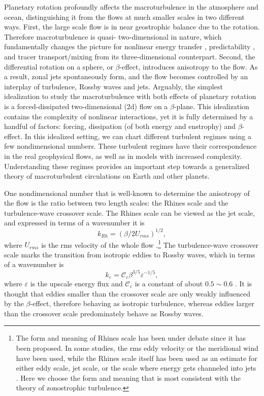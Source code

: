 \documentclass{jfm}
\begin{document}
Planetary rotation profoundly affects the macroturbulence in the
atmosphere and ocean, distinguishing it from the flows at much smaller
scales in two different ways. First, the large scale flow is in near
geostrophic balance due to the rotation. Therefore macroturbulence
is quasi- two-dimensional in nature, which fundamentally changes the
picture for nonlinear energy transfer \citep{Kraichnan1967,Charney1971},
predictability \citep{Leith1971,Leith1972}, and tracer transport/mixing
\citep{Batchelor1959,Shuckburgh2003} from its three-dimensional counterpart.
Second, the differential rotation on a sphere, or $\beta$-effect,
introduces anisotropy to the flow. As a result, zonal jets spontaneously
form, and the flow becomes controlled by an interplay of turbulence, Rossby waves
and jets. Arguably, the simplest idealization to study the macroturbulence
with both effects of planetary rotation is a forced-dissipated two-dimensional
(2d) flow on a $\beta$-plane. This idealization contains the complexity
of nonlinear interactions, yet it is fully determined by a handful
of factors: forcing, dissipation (of both energy and enstrophy) and
$\beta$-effect. In this idealized setting, we can chart
different turbulent regimes using a few nondimensional numbers.
These turbulent regimes have their correspondence in the real geophysical
flows, as well as in models with increased complexity. Understanding
these regimes provides an important step towards a generalized theory 
of macroturbulent circulations on Earth and other planets.

One nondimensional number that is well-known to determine the anisotropy
of the flow is the ratio between two length scales: the Rhines scale
and the turbulence-wave crossover scale. The Rhines scale
can be viewed as the jet scale, and expressed in terms of a wavenumber it is
\begin{equation}
    k_{Rh}=(\beta/2U_{rms})^{1/2},\label{eq:Rhines_wavenumber_beta_Urms}
\end{equation}
where $U_{rms}$ is the rms velocity of the whole flow \citep{Rhines1975}.\footnote{
The form and meaning of Rhines scale has been under debate since it has been proposed.
In some studies, the rms eddy velocity or the meridional wind have been used, while the Rhines scale itself
has been used as an estimate for either eddy scale, jet scale, or
the scale where energy gets channeled into jets \citep{Williams1978,Jansen2012,Chai2014,Liu2015,Chemke2015}.
Here we choose the form and meaning that is most consistent 
with the theory of zonostrophic turbulence.}
The turbulence-wave crossover scale marks the transition from
isotropic eddies to Rossby waves, which in terms of a wavenumber is
\begin{equation}
    k_{\varepsilon}=\mathcal{C}_{\varepsilon}\beta^{3/5}\varepsilon^{-1/5},\label{eq:classical_crossover_wavenumber}
\end{equation}
where $\varepsilon$ is the upscale energy flux and $\mathcal{C}_{\varepsilon}$ is a constant of about
$0.5\sim0.6$ \citep{Vallis1993,Galperin2010,Smith2002}. It is thought that
eddies smaller than the crossover scale are only weakly influenced by the 
$\beta$-effect, therefore behaving as isotropic turbulence, whereas eddies 
larger than the crossover scale predominately behave as Rossby waves.
\end{document}
